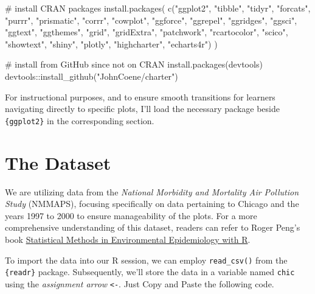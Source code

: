 \documentclass[
  letterpaper,
  DIV=11,
  numbers=noendperiod]{scrreprt}
\newenvironment{Shaded}{\begin{snugshade}}{\end{snugshade}}
\newcommand{\CommentTok}[1]{\textcolor[rgb]{0.37,0.37,0.37}{#1}}
\newcommand{\FunctionTok}[1]{\textcolor[rgb]{0.28,0.35,0.67}{#1}}
\newcommand{\NormalTok}[1]{\textcolor[rgb]{0.00,0.23,0.31}{#1}}
\newcommand{\SpecialCharTok}[1]{\textcolor[rgb]{0.37,0.37,0.37}{#1}}
\newcommand{\StringTok}[1]{\textcolor[rgb]{0.13,0.47,0.30}{#1}}
\begin{document}
\begin{Shaded}
\begin{Highlighting}[]
\CommentTok{\# install CRAN packages}
\FunctionTok{install.packages}\NormalTok{(}
  \FunctionTok{c}\NormalTok{(}\StringTok{"ggplot2"}\NormalTok{, }\StringTok{"tibble"}\NormalTok{, }\StringTok{"tidyr"}\NormalTok{, }\StringTok{"forcats"}\NormalTok{, }\StringTok{"purrr"}\NormalTok{, }\StringTok{"prismatic"}\NormalTok{, }\StringTok{"corrr"}\NormalTok{, }
    \StringTok{"cowplot"}\NormalTok{, }\StringTok{"ggforce"}\NormalTok{, }\StringTok{"ggrepel"}\NormalTok{, }\StringTok{"ggridges"}\NormalTok{, }\StringTok{"ggsci"}\NormalTok{, }\StringTok{"ggtext"}\NormalTok{, }\StringTok{"ggthemes"}\NormalTok{, }
    \StringTok{"grid"}\NormalTok{, }\StringTok{"gridExtra"}\NormalTok{, }\StringTok{"patchwork"}\NormalTok{, }\StringTok{"rcartocolor"}\NormalTok{, }\StringTok{"scico"}\NormalTok{, }\StringTok{"showtext"}\NormalTok{, }
    \StringTok{"shiny"}\NormalTok{, }\StringTok{"plotly"}\NormalTok{, }\StringTok{"highcharter"}\NormalTok{, }\StringTok{"echarts4r"}\NormalTok{)}
\NormalTok{)}

\CommentTok{\# install from GitHub since not on CRAN}
\FunctionTok{install.packages}\NormalTok{(devtools)}
\NormalTok{devtools}\SpecialCharTok{::}\FunctionTok{install\_github}\NormalTok{(}\StringTok{"JohnCoene/charter"}\NormalTok{)}
\end{Highlighting}
\end{Shaded}

For instructional purposes, and to ensure smooth transitions for
learners navigating directly to specific plots, I'll load the necessary
package beside \texttt{\{ggplot2\}} in the corresponding section.


\chapter{The Dataset}\label{data}

We are utilizing data from the \emph{National Morbidity and Mortality
Air Pollution Study} (NMMAPS), focusing specifically on data pertaining
to Chicago and the years 1997 to 2000 to ensure manageability of the
plots. For a more comprehensive understanding of this dataset, readers
can refer to Roger Peng's book
\href{http://www.springer.com/de/book/9780387781662}{Statistical Methods
in Environmental Epidemiology with R}.

To import the data into our R session, we can employ
\texttt{read\_csv()} from the \texttt{\{readr\}} package. Subsequently,
we'll store the data in a variable named \texttt{chic} using the
\emph{assignment arrow} \texttt{\textless{}-}. Just Copy and Paste the
following code.
\end{document}
